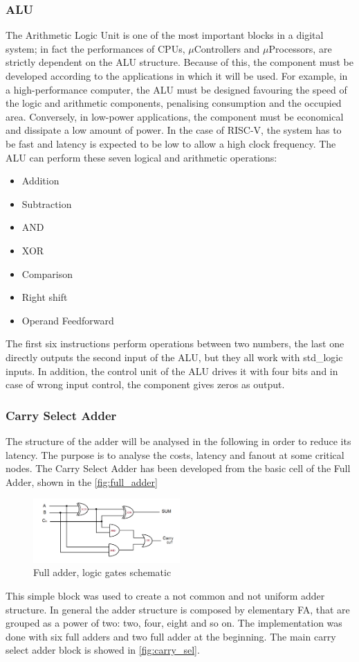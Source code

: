 \subsubsection{ALU}
The Arithmetic Logic Unit is one of the most important blocks in a digital system; in fact the performances of CPUs, $\mu$Controllers and $\mu$Processors, are strictly dependent on the ALU structure. Because of this, the component must be developed according to the applications in which it will be used. For example, in a high-performance computer, the ALU must be designed favouring the speed of the logic and arithmetic components, penalising consumption and the occupied area. Conversely, in low-power applications, the component must be economical and dissipate a low amount of power. In the case of RISC-V, the system has to be fast and latency is expected to be low to allow a high clock frequency.  The ALU can perform these seven logical and arithmetic operations:

\begin{itemize}
	\item Addition
	\item Subtraction
	\item AND
	\item XOR
	\item Comparison
	\item Right shift
	\item Operand Feedforward
\end{itemize}
\noindent
The first six instructions perform operations between two numbers, the last one directly outputs the second input of the ALU, but they all work with std\_logic inputs. In addition, the control unit of the ALU drives it with four bits and in case of wrong input control, the component gives zeros as output.

\subsubsection{Carry Select Adder}
The structure of the adder will be analysed in the following in order to reduce its latency. The purpose is to analyse the costs, latency and fanout at some critical nodes. The Carry Select Adder has been developed from the basic cell of the Full Adder, shown in the \autoref{fig:full_adder}

\begin{figure}[htbp]
	\centering
	\includegraphics[width=0.5\textwidth]{sec2/images/full_adder.png}
	\caption{Full adder, logic gates schematic}
	\label{fig:full_adder}
\end{figure}
\noindent
This simple block was used to create a not common and not uniform adder structure. In general the adder structure is composed by elementary FA, that are grouped as a power of two: two, four, eight and so on. The implementation was done with six full adders and two full adder at the beginning. The main carry select adder block is showed in \autoref{fig:carry_sel}.

